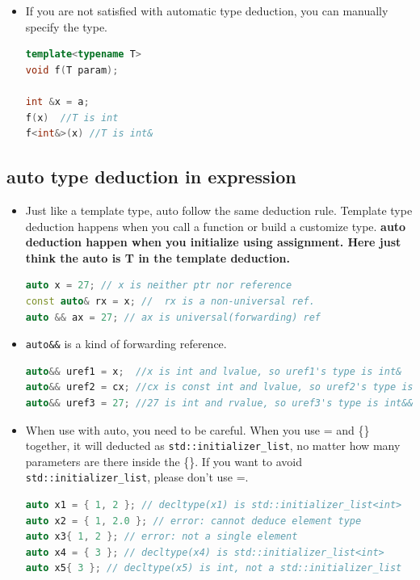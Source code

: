 \documentclass[a4paper,11pt,twoside]{book}
\begin{document}
\begin{itemize}
	\item If you are not satisfied with automatic type deduction, you can manually specify the type.  
\begin{lstlisting}[frame=single, language=c++]
template<typename T>
void f(T param); 
	
int &x = a;
f(x)  //T is int
f<int&>(x) //T is int&
\end{lstlisting}

\end{itemize}
	
\subsection{auto type deduction in expression}
\begin{itemize}
	\item Just like a template type, auto follow the same deduction rule. Template type deduction happens when you call a function or build a customize type. \textbf{auto deduction happen when you initialize using assignment. Here just think the auto is T in the template deduction.}
	
\begin{lstlisting}[frame=single, language=c++]
auto x = 27; // x is neither ptr nor reference
const auto& rx = x; //  rx is a non-universal ref.
auto && ax = 27; // ax is universal(forwarding) ref
\end{lstlisting}

    \item \texttt{auto\&\&} is a kind of forwarding reference.
\begin{lstlisting}[frame=single, language=c++]
auto&& uref1 = x;  //x is int and lvalue, so uref1's type is int&
auto&& uref2 = cx; //cx is const int and lvalue, so uref2's type is const int&
auto&& uref3 = 27; //27 is int and rvalue, so uref3's type is int&&
\end{lstlisting}

	\item When use with auto, you need to be careful. When you use = and \{\} together, it will deducted as \texttt{std::initializer\_list}, no matter how many parameters are there inside the \{\}. If you want to avoid \texttt{std::initializer\_list}, please don't use =. 
\begin{lstlisting}[frame=single, language=c++]
auto x1 = { 1, 2 }; // decltype(x1) is std::initializer_list<int>
auto x2 = { 1, 2.0 }; // error: cannot deduce element type
auto x3{ 1, 2 }; // error: not a single element
auto x4 = { 3 }; // decltype(x4) is std::initializer_list<int>
auto x5{ 3 }; // decltype(x5) is int, not a std::initializer_list
\end{lstlisting}


\end{itemize}
\end{document}

